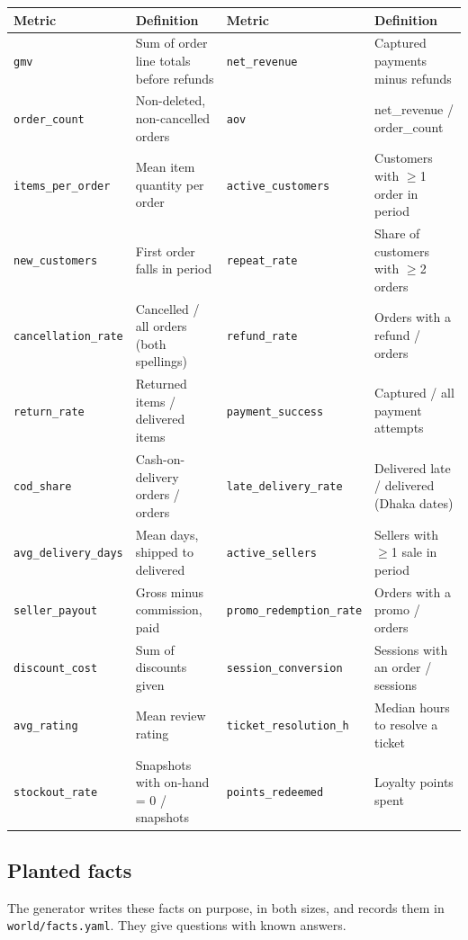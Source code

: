 \documentclass[11pt,a4paper]{article}
\newcommand{\code}[1]{\texttt{\small #1}}
\begin{document}
\begin{center}
\small
\begin{tabularx}{\linewidth}{@{}l X l X@{}}
\toprule
\textbf{Metric} & \textbf{Definition} & \textbf{Metric} & \textbf{Definition}\\
\midrule
\code{gmv} & Sum of order line totals before refunds & \code{net\_revenue} & Captured payments minus refunds\\
\code{order\_count} & Non-deleted, non-cancelled orders & \code{aov} & net\_revenue / order\_count\\
\code{items\_per\_order} & Mean item quantity per order & \code{active\_customers} & Customers with $\geq$1 order in period\\
\code{new\_customers} & First order falls in period & \code{repeat\_rate} & Share of customers with $\geq$2 orders\\
\code{cancellation\_rate} & Cancelled / all orders (both spellings) & \code{refund\_rate} & Orders with a refund / orders\\
\code{return\_rate} & Returned items / delivered items & \code{payment\_success} & Captured / all payment attempts\\
\code{cod\_share} & Cash-on-delivery orders / orders & \code{late\_delivery\_rate} & Delivered late / delivered (Dhaka dates)\\
\code{avg\_delivery\_days} & Mean days, shipped to delivered & \code{active\_sellers} & Sellers with $\geq$1 sale in period\\
\code{seller\_payout} & Gross minus commission, paid & \code{promo\_redemption\_rate} & Orders with a promo / orders\\
\code{discount\_cost} & Sum of discounts given & \code{session\_conversion} & Sessions with an order / sessions\\
\code{avg\_rating} & Mean review rating & \code{ticket\_resolution\_h} & Median hours to resolve a ticket\\
\code{stockout\_rate} & Snapshots with on-hand = 0 / snapshots & \code{points\_redeemed} & Loyalty points spent\\
\bottomrule
\end{tabularx}
\end{center}

\subsection{Planted facts}

The generator writes these facts on purpose, in both sizes, and records
them in \code{world/facts.yaml}. They give questions with known answers.
\end{document}

